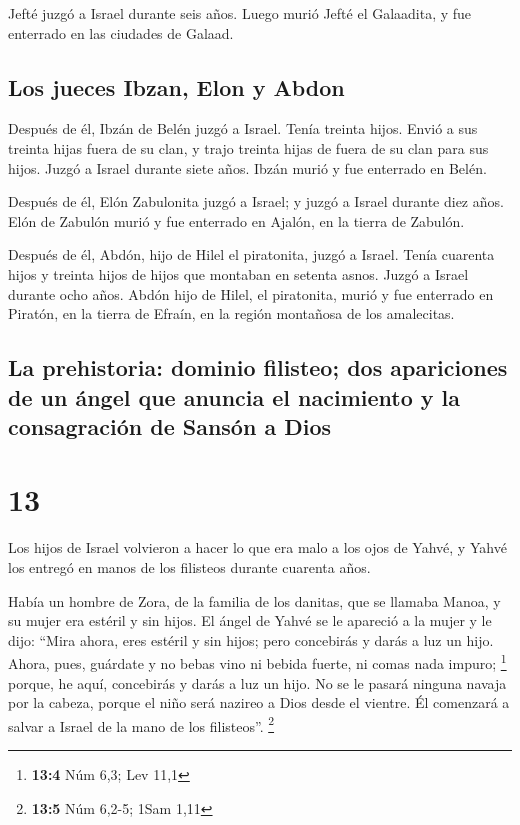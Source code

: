  Jefté juzgó a Israel durante seis años. Luego murió Jefté
el Galaadita, y fue enterrado en las ciudades de Galaad.

\hypertarget{los-jueces-ibzan-elon-y-abdon}{%
\subsection{Los jueces Ibzan, Elon y
Abdon}\label{los-jueces-ibzan-elon-y-abdon}}

 Después de él, Ibzán de Belén juzgó a Israel.
 Tenía treinta hijos. Envió a sus treinta hijas fuera de
su clan, y trajo treinta hijas de fuera de su clan para sus hijos. Juzgó
a Israel durante siete años.  Ibzán murió y fue enterrado
en Belén.

 Después de él, Elón Zabulonita juzgó a Israel; y juzgó a
Israel durante diez años.  Elón de Zabulón murió y fue
enterrado en Ajalón, en la tierra de Zabulón.

 Después de él, Abdón, hijo de Hilel el piratonita, juzgó
a Israel.  Tenía cuarenta hijos y treinta hijos de hijos
que montaban en setenta asnos. Juzgó a Israel durante ocho años.
 Abdón hijo de Hilel, el piratonita, murió y fue
enterrado en Piratón, en la tierra de Efraín, en la región montañosa de
los amalecitas.

\hypertarget{la-prehistoria-dominio-filisteo-dos-apariciones-de-un-uxe1ngel-que-anuncia-el-nacimiento-y-la-consagraciuxf3n-de-sansuxf3n-a-dios}{%
\subsection{La prehistoria: dominio filisteo; dos apariciones de un
ángel que anuncia el nacimiento y la consagración de Sansón a
Dios}\label{la-prehistoria-dominio-filisteo-dos-apariciones-de-un-uxe1ngel-que-anuncia-el-nacimiento-y-la-consagraciuxf3n-de-sansuxf3n-a-dios}}

\hypertarget{section-12}{%
\section{13}\label{section-12}}

 Los hijos de Israel volvieron a hacer lo que era malo a
los ojos de Yahvé, y Yahvé los entregó en manos de los filisteos durante
cuarenta años.

 Había un hombre de Zora, de la familia de los danitas,
que se llamaba Manoa, y su mujer era estéril y sin hijos. 
El ángel de Yahvé se le apareció a la mujer y le dijo: ``Mira ahora,
eres estéril y sin hijos; pero concebirás y darás a luz un hijo.
 Ahora, pues, guárdate y no bebas vino ni bebida fuerte,
ni comas nada impuro; \footnote{\textbf{13:4} Núm 6,3; Lev 11,1}
 porque, he aquí, concebirás y darás a luz un hijo. No se
le pasará ninguna navaja por la cabeza, porque el niño será nazireo a
Dios desde el vientre. Él comenzará a salvar a Israel de la mano de los
filisteos''. \footnote{\textbf{13:5} Núm 6,2-5; 1Sam 1,11}

